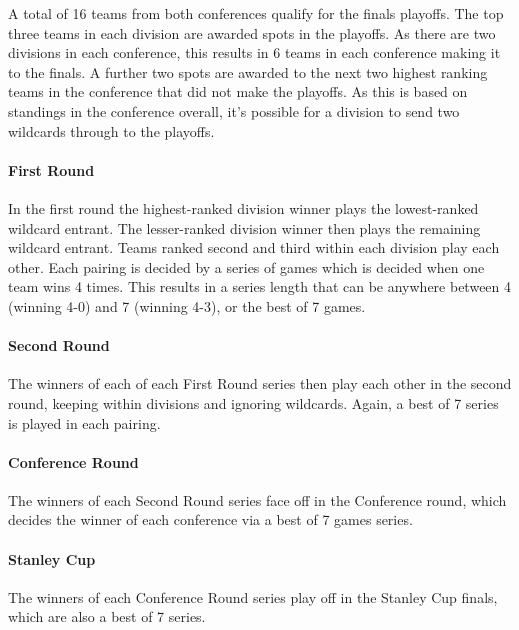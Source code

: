 \documentclass[]{article}
\let\oldparagraph\paragraph
\renewcommand{\paragraph}[1]{\oldparagraph{#1}\mbox{}}
\begin{document}
A total of 16 teams from both conferences qualify for the finals
playoffs. The top three teams in each division are awarded spots in the
playoffs. As there are two divisions in each conference, this results in
6 teams in each conference making it to the finals. A further two spots
are awarded to the next two highest ranking teams in the conference that
did not make the playoffs. As this is based on standings in the
conference overall, it's possible for a division to send two wildcards
through to the playoffs.

\paragraph{First Round}\label{first-round}

In the first round the highest-ranked division winner plays the
lowest-ranked wildcard entrant. The lesser-ranked division winner then
plays the remaining wildcard entrant. Teams ranked second and third
within each division play each other. Each pairing is decided by a
series of games which is decided when one team wins 4 times. This
results in a series length that can be anywhere between 4 (winning 4-0)
and 7 (winning 4-3), or the best of 7 games.

\paragraph{Second Round}\label{second-round}

The winners of each of each First Round series then play each other in
the second round, keeping within divisions and ignoring wildcards.
Again, a best of 7 series is played in each pairing.

\paragraph{Conference Round}\label{conference-round}

The winners of each Second Round series face off in the Conference
round, which decides the winner of each conference via a best of 7 games
series.

\paragraph{Stanley Cup}\label{stanley-cup}

The winners of each Conference Round series play off in the Stanley Cup
finals, which are also a best of 7 series.
\end{document}

